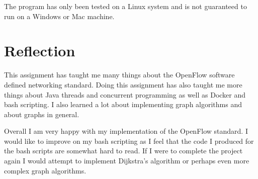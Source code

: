 \documentclass{article}
\begin{document}
The program has only been tested on a Linux system and is not guaranteed to run
on a Windows or Mac machine.

\section{Reflection}
This assignment has taught me many things about the OpenFlow software defined
networking standard. Doing this assignment has also taught me more things about
Java threads and concurrent programming as well as Docker and bash scripting. I
also learned a lot about implementing graph algorithms and about graphs in
general.

Overall I am very happy with my implementation of the OpenFlow standard. I would
like to improve on my bash scripting as I feel that the code I produced for the
bash scripts are somewhat hard to read. If I were to complete the project again
I would attempt to implement Dijkstra's algorithm or perhaps even more complex
graph algorithms.
\end{document}

